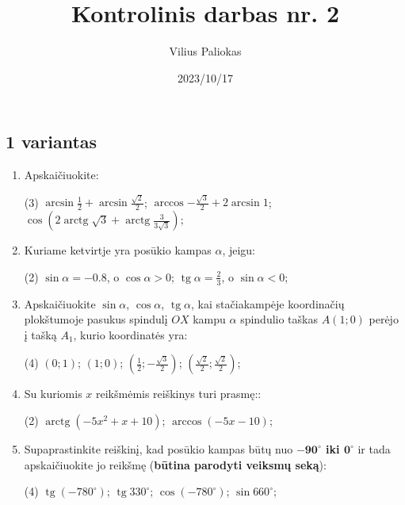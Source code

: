 \documentclass[a4paper]{article}
\title{Kontrolinis darbas nr. 2}
\author{Vilius Paliokas}
\date{2023/10/17}
\DeclareMathOperator{\tg}{tg}
\DeclareMathOperator{\arctg}{arctg}
\begin{document}
\thispagestyle{empty}
\subsection*{1 variantas}

\begin{enumerate}
      \item Apskaičiuokite:

            \begin{tasks}[item-format={\normalfont}, after-item-skip=4mm](3)
                  \task $\arcsin{\frac{1}{2}} + \arcsin{\frac{\sqrt{2}}{2}} $;
                  \task $\arccos{-\frac{\sqrt{3}}{2}} + 2\arcsin{1} $;
                  \task $\cos({2\arctg{\sqrt{3}} +
                              \arctg{\frac{3}{3\sqrt{3}}}})  $;

            \end{tasks}

      \item Kuriame ketvirtje yra posūkio kampas $\alpha$, jeigu:
            \begin{tasks}[item-format={\normalfont}, after-item-skip=4mm](2)
                  \task $\sin \alpha = -0.8$, o $\cos \alpha > 0$;
                  \task $\tg \alpha = \frac{2}{3}$, o $\sin \alpha < 0$;
            \end{tasks}
      \item Apskaičiuokite $\sin \alpha$, $\cos \alpha$, $\tg \alpha$, kai
            stačiakampėje koordinačių plokštumoje pasukus spindulį $OX$ kampu
            $\alpha$ spindulio taškas $A(1; 0)$ perėjo į tašką $A_{1}$, kurio
            koordinatės
            yra:
            \begin{tasks}[item-format={\normalfont}, after-item-skip=4mm](4)
                  \task $(0; 1)$;
                  \task $(1; 0)$;
                  \task $(\frac{1}{2}; -\frac{\sqrt{3}}{2})$;
                  \task $(\frac{\sqrt{2}}{2}; \frac{\sqrt{2}}{2})$;
            \end{tasks}

      \item Su kuriomis $x$ reikšmėmis reiškinys turi prasmę::
            \begin{tasks}[item-format={\normalfont},
                        after-item-skip=4mm](2)
                  \task $\arctg(-5x^2+x+10)$;
                  \task $\arccos(-5x-10)$;
            \end{tasks}
      \item Supaprastinkite reiškinį, kad posūkio kampas būtų nuo
            \textbf{$\boldsymbol{-90^\circ}$
                  iki  $\boldsymbol{0^\circ}$} ir tada apskaičiuokite jo
            reikšmę
            (\textbf{būtina parodyti veiksmų seką}):
            \begin{tasks}[item-format={\normalfont},
                        after-item-skip=4mm](4)
                  \task $\tg (-780^\circ)$;
                  \task $\tg 330^\circ$;
                  \task $\cos (-780^\circ)$;
                  \task $\sin 660^\circ$;
            \end{tasks}


\end{enumerate}
\end{document}
